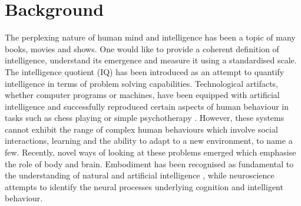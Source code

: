 \chapter{Background}
\label{chap:background}

The perplexing nature of human mind and intelligence has been a topic of many 
books, movies and shows. 
One would like to provide a coherent definition of intelligence, understand its 
emergence and measure it using a standardised scale.
The intelligence quotient (IQ) has been introduced as an attempt to quantify 
intelligence in terms of problem solving capabilities. 
Technological artifacts, whether computer programs or machines, have been 
equipped with artificial intelligence and successfully reproduced certain 
aspects of human behaviour in tasks such as chess playing \citep{ibmdeepblue} 
or simple psychotherapy \citep{Weizenbaum66}. However, these systems cannot 
exhibit the range of complex human behaviours which involve social 
interactions, learning and the ability to adapt to a new environment, to name a 
few. 
Recently, novel ways of looking at these problems emerged which emphasise the 
role of body and brain.
Embodiment has been recognised as fundamental to the understanding of natural 
and artificial intelligence \citep{Pfeifer2006}, while neuroscience attempts to 
identify the neural processes underlying cognition and intelligent behaviour.

